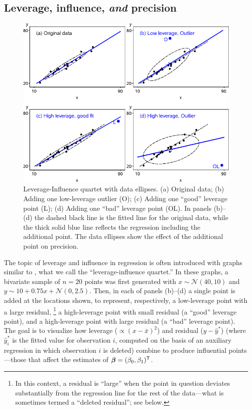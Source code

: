 \subsection{Leverage, influence, \emph{and} precision}

\begin{figure}[htb!]
  \centering
  \includegraphics[width=\textwidth,clip]{fig/levdemo21}
  \caption{Leverage-Influence quartet with data ellipses. (a) Original data;
  (b) Adding one low-leverage outlier (O); (c) Adding one ``good'' leverage point (L);
  (d) Adding one ``bad'' leverage point (OL).
  In panels (b)--(d) the dashed black line is the fitted line for the original
  data, while the thick solid blue line reflects the  regression including the additional point.
  The data ellipses show the effect of the additional point on precision.}%
  \label{fig:levdemo21}
\end{figure}

The topic of leverage and influence in regression is often introduced with graphs
similar to , what we call
the ``leverage-influence quartet.''
In these graphs, a bivariate sample of $n=20$ points was first generated
with $x \sim \mathcal{N}(40, 10)$ and $y \sim10 +  0.75 x + \mathcal{N}(0, 2.5)$.
Then, in each of
panels (b)--(d) a single point is added at the locations shown, to represent, respectively,
a low-leverage point with a large residual,%
\footnote{In this context, a residual is ``large'' when the point in question deviates substantially from the
regression line for the rest of the data---what is sometimes termed a ``deleted residual''; see below.} 
a high-leverage point with small residual
(a ``good'' leverage point), and a high-leverage point with large residual
(a ``bad'' leverage point).  The goal is to visualize how leverage ($\propto (x-\bar{x})^2$) and
residual ($y - \hat{y}^{*}$) (where $\hat{y}^{*}_{i}$ is the fitted value for observation $i$, computed on the basis of an auxiliary regression in which observation $i$ is deleted) combine to produce influential points---those that affect
the estimates of $\bm{\beta} = (\beta_0 , \beta_1)^\mathsf{T}$.


